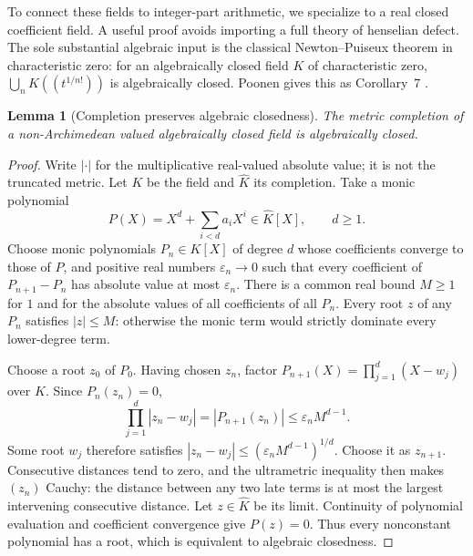 \documentclass[11pt]{article}
\numberwithin{equation}{section}
\newtheorem{lemma}[lemma]{Lemma}
\theoremstyle{definition}
\theoremstyle{remark}
\begin{document}
To connect these fields to integer-part arithmetic, we specialize to a real
closed coefficient field. A useful proof avoids importing a full theory of
henselian defect. The sole substantial algebraic input is the classical
Newton--Puiseux theorem in characteristic zero: for an algebraically closed
field $K$ of characteristic zero, $\bigcup_n K((t^{1/n!}))$ is algebraically
closed. Poonen gives this as Corollary~7 \cite{Poonen}.

\begin{lemma}[Completion preserves algebraic closedness]
\label{pma:ser:lem:completionac}
The metric completion of a non-Archimedean valued algebraically closed field
is algebraically closed.
\end{lemma}
\begin{proof}
Write $|\cdot|$ for the multiplicative real-valued absolute value; it is not
the truncated metric. Let $K$ be the field and $\widehat K$ its completion.
Take a monic polynomial
\[
 P(X)=X^d+\sum_{i<d}a_iX^i\in\widehat K[X],\qquad d\geq1.
\]
Choose monic polynomials $P_n\in K[X]$ of degree $d$ whose coefficients
converge to those of $P$, and positive real numbers $\varepsilon_n\to0$
such that every coefficient of $P_{n+1}-P_n$ has absolute value at most
$\varepsilon_n$. There is a common real bound $M\geq1$ for $1$ and for the
absolute values of all coefficients of all $P_n$.
Every root $z$ of any $P_n$ satisfies $|z|\leq M$: otherwise the monic term
would strictly dominate every lower-degree term.

Choose a root $z_0$ of $P_0$. Having chosen $z_n$, factor
$P_{n+1}(X)=\prod_{j=1}^d(X-w_j)$ over $K$. Since $P_n(z_n)=0$,
\[
 \prod_{j=1}^d|z_n-w_j|
 =|P_{n+1}(z_n)|
 \leq \varepsilon_n M^{d-1}.
\]
Some root $w_j$ therefore satisfies
$|z_n-w_j|\leq(\varepsilon_n M^{d-1})^{1/d}$.
Choose it as $z_{n+1}$. Consecutive distances tend to zero, and the
ultrametric inequality then makes $(z_n)$ Cauchy: the distance between any
two late terms is at most the largest intervening consecutive distance.
Let $z\in\widehat K$ be its limit. Continuity of polynomial evaluation and
coefficient convergence give $P(z)=0$. Thus every nonconstant polynomial
has a root, which is equivalent to algebraic closedness.
\end{proof}
\end{document}
